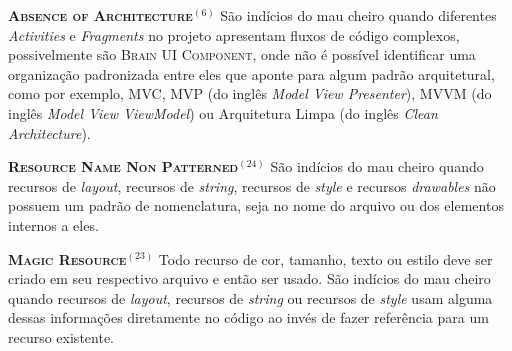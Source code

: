   \noindent
  \textsc{\textbf{{\small Absence of Architecture}}}$^{(6)}$ São indícios do mau cheiro quando diferentes \textit{Activities} e \textit{Fragments} no projeto apresentam fluxos de código complexos, possivelmente são \textsc{\small Brain UI Component}, onde não é possível identificar uma organização padronizada entre eles que aponte para algum padrão arquitetural, como por exemplo, MVC, MVP (do inglês \textit{Model View Presenter}), MVVM (do inglês \textit{Model View ViewModel}) ou Arquitetura Limpa (do inglês \textit{Clean Architecture}).



  \noindent
  \textbf{\textsc{{\small Resource Name Non Patterned}}}$^{(24)}$
      São indícios do mau cheiro quando recursos de \textit{layout}, recursos de \textit{string}, recursos de \textit{style} e recursos \textit{drawables} não possuem um padrão de nomenclatura, seja no nome do arquivo ou dos elementos internos a eles.



  \noindent
  \textbf{\textsc{{\small Magic Resource}}}$^{(23)}$
      Todo recurso de cor, tamanho, texto ou estilo deve ser criado em seu respectivo arquivo e então ser usado. São indícios do mau cheiro quando recursos de \textit{layout}, recursos de \textit{string} ou recursos de \textit{style} usam alguma dessas informações diretamente no código ao invés de fazer referência para um recurso existente.

